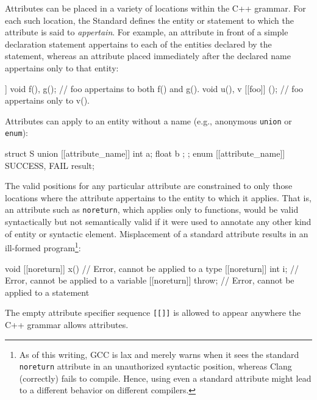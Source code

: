 Attributes can be placed in a variety of locations within the C++ grammar.  For each such location, the Standard defines the entity or statement to which the attribute is said to \emph{appertain}. For example, an attribute in front of a simple declaration statement appertains to each of the entities declared by the statement, whereas an attribute placed immediately after the declared name appertains only to that entity:

\begin{emcppslisting}[language=C]
[[foo]] void f(), g();   // foo appertains to both f() and g().
void u(), v [[foo]] ();  // foo appertains only to v().
\end{emcppslisting}

\noindent Attributes can apply to an entity without a name (e.g., anonymous \lstinline!union! or \lstinline!enum!):

\begin{emcppslisting}[language=C++]
struct S { union [[attribute_name]] { int a; float b }; };
enum [[attribute_name]] { SUCCESS, FAIL } result;
\end{emcppslisting}

\noindent The valid positions for any particular attribute are constrained to only those locations
where the attribute appertains to the entity to which it applies. That is, an attribute such as \lstinline!noreturn!,
which applies only to functions, would be valid syntactically but not semantically valid if it were used to annotate
any other kind of entity or syntactic element.  Misplacement of a standard attribute results
in an ill-formed program\footnote{As of this writing, GCC is lax and merely
warns when it sees the standard \lstinline!noreturn! attribute in an
unauthorized syntactic position, whereas Clang (correctly) fails to
compile. Hence, using even a standard attribute might
  lead to a different behavior on different compilers.}:

\begin{emcppslisting}[language=C]
void [[noreturn]] x() {       // Error, cannot be applied to a type
     [[noreturn]] int i;      // Error, cannot be applied to a variable
     [[noreturn]] { throw; }  // Error, cannot be applied to a statement
}
\end{emcppslisting}

\noindent The empty attribute specifier sequence \lstinline![[]]! is allowed to appear anywhere the C++ grammar allows attributes.



